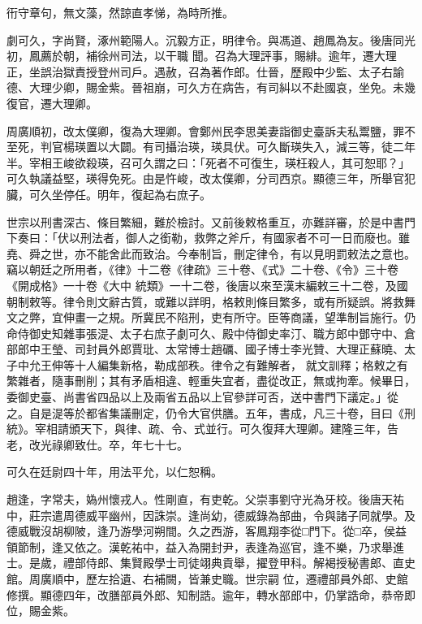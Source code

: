 \begin{pinyinscope}
 衎守章句，無文藻，然諒直孝悌，為時所推。



 劇可久，字尚賢，涿州範陽人。沉毅方正，明律令。與馮道、趙鳳為友。後唐同光初，鳳薦於朝，補徐州司法，以干職
 聞。召為大理評事，賜緋。逾年，遷大理正，坐誤治獄責授登州司戶。遇赦，召為著作郎。仕晉，歷殿中少監、太子右諭德、大理少卿，賜金紫。晉祖崩，可久方在病告，有司糾以不赴國哀，坐免。未幾復官，遷大理卿。



 周廣順初，改太僕卿，復為大理卿。會鄭州民李思美妻詣御史臺訴夫私鬻鹽，罪不至死，判官楊瑛置以大闢。有司攝治瑛，瑛具伏。可久斷瑛失入，減三等，徒二年半。宰相王峻欲殺瑛，召可久謂之曰：「死者不可復生，瑛枉殺人，其可恕耶？」
 可久執議益堅，瑛得免死。由是忤峻，改太僕卿，分司西京。顯德三年，所舉官犯臟，可久坐停任。明年，復起為右庶子。



 世宗以刑書深古、條目繁細，難於檢討。又前後敕格重互，亦難詳審，於是中書門下奏曰：「伏以刑法者，御人之銜勒，救弊之斧斤，有國家者不可一日而廢也。雖堯、舜之世，亦不能舍此而致治。今奉制旨，刪定律令，有以見明罰敕法之意也。竊以朝廷之所用者，《律》十二卷《律疏》三十卷、《式》二十卷、《令》三十卷《開成格》一十卷《大中
 統類》一十二卷，後唐以來至漢末編敕三十二卷，及國朝制敕等。律令則文辭古質，或難以詳明，格敕則條目繁多，或有所疑誤。將救舞文之弊，宜伸畫一之規。所冀民不陷刑，吏有所守。臣等商議，望準制旨施行。仍命侍御史知雜事張湜、太子右庶子劇可久、殿中侍御史率汀、職方郎中鄧守中、倉部郎中王瑩、司封員外郎賈玭、太常博士趙礪、國子博士李光贊、大理正蘇曉、太子中允王伸等十人編集新格，勒成部秩。律令之有難解者，
 就文訓釋；格敕之有繁雜者，隨事刪削；其有矛盾相違、輕重失宜者，盡從改正，無或拘牽。候畢日，委御史臺、尚書省四品以上及兩省五品以上官參詳可否，送中書門下議定。」從之。自是湜等於都省集議刪定，仍令大官供膳。五年，書成，凡三十卷，目曰《刑統》。宰相請頒天下，與律、疏、令、式並行。可久復拜大理卿。建隆三年，告老，改光祿卿致仕。卒，年七十七。



 可久在廷尉四十年，用法平允，以仁恕稱。



 趙逢，字常夫，媯州懷戎人。性剛直，有吏乾。父崇事劉守光為牙校。後唐天祐中，莊宗遣周德威平幽州，因誅崇。逢尚幼，德威錄為部曲，令與諸子同就學。及德威戰沒胡柳陂，逢乃游學河朔間。久之西游，客鳳翔李從□門下。從□卒，侯益領節制，逢又依之。漢乾祐中，益入為開封尹，表逢為巡官，逢不樂，乃求舉進士。是歲，禮部侍郎、集賢殿學士司徒翊典貢舉，擢登甲科。解褐授秘書郎、直史館。周廣順中，歷左拾遺、右補闕，皆兼史職。世宗嗣
 位，遷禮部員外郎、史館修撰。顯德四年，改膳部員外郎、知制誥。逾年，轉水部郎中，仍掌誥命，恭帝即位，賜金紫。




\end{pinyinscope}
